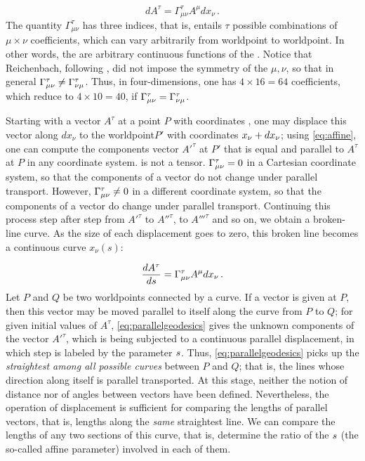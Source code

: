 \documentclass[final]{article}
\newcommand{\wpo}{worldpoint\xspace}
\begin{document}
\begin{equation}\label{eq:affine}
dA^\tau = \Gamma^\tau_{\mu\nu}A^{\mu} dx_\nu\,.
\end{equation}
%
The quantity $\Gamma^\tau_{\mu\nu}$ has three indices, that is, entails $\tau$ possible combinations of $\mu \times \nu$ coefficients, which can vary arbitrarily from \wpo to \wpo. In other words, the \Gtmn are arbitrary continuous functions of the \xn. Notice that Reichenbach, following \citet{Schouten1922a}, did not impose the symmetry of the $\mu,\nu$, so that in general $\Gamma^\tau_{\mu\nu} \neq \Gamma^\tau_{\nu\mu}$. Thus, in four-dimensions, one has $4 \times 16 = 64$ coefficients, which reduce to $4 \times 10 = 40$, if $\Gamma^\tau_{\mu\nu} = \Gamma^\tau_{\nu\mu}$.

Starting with a vector $A^\tau$ at a point $P$ with coordinates \xn, one may displace this vector along $dx_\nu$ to the \wpo $P'$ with coordinates $x_{\nu}+dx_\nu$; using \cref{eq:affine}, one can compute the components vector $A'^\tau$ at $P'$ that is equal and parallel to $A^\tau$ at $P$ in any coordinate system. \Gtmn is not a tensor. $\Gamma^\tau_{\mu\nu}=0$ in a Cartesian coordinate system, so that the components of a vector do not change under parallel transport. However, $\Gamma^\tau_{\mu\nu}\neq 0$ in a different coordinate system, so that the components of a vector do change under parallel transport. Continuing this process step after step from $A'^\tau$ to $A''^\tau$, to $A'''^\tau$ and so on, we obtain a broken-line curve. As the size of each displacement goes to zero, this broken line becomes a continuous curve $x_\nu(s)$: 

\begin{equation}\label{eq:parallelgeodesics}
\frac{d {A}^{\tau}}{ds} = \Gamma^\tau_{\mu\nu}A^{\mu} dx_\nu\,. 
\end{equation}
%
Let $P$ and $Q$ be two \wpo{}s connected by a curve. If a vector is given at $P$, then this vector may be moved parallel to itself along the curve from $P$ to $Q$; for given initial values of $A^\tau$, \cref{eq:parallelgeodesics} gives the unknown components of the vector $A'^\tau$, which is being subjected to a continuous parallel displacement, in which step is labeled by the parameter $s$. Thus, \cref{eq:parallelgeodesics} picks up the \emph{straightest among all possible curves} between $P$ and $Q$; that is, the lines whose direction along itself is parallel transported. At this stage, neither the notion of distance nor of angles between vectors have been defined. Nevertheless, the operation of displacement is sufficient for comparing the lengths of parallel vectors, that is, lengths along the \emph{same} straightest line. We can compare the lengths of any two sections of this curve, that is, determine the ratio of the  $s$ (the so-called affine parameter) involved in each of them.
\end{document}
